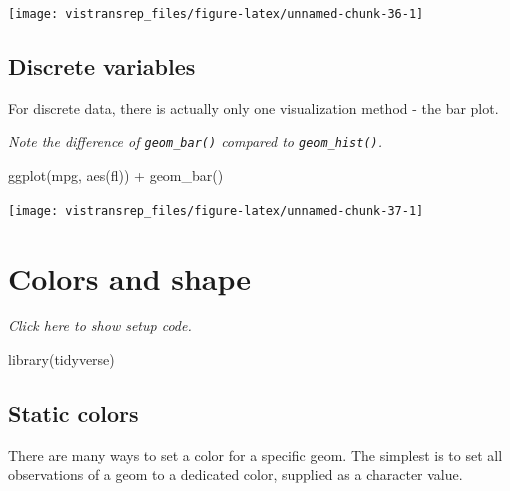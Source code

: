 \documentclass[]{book}
\newenvironment{Shaded}{}{}
\newcommand{\KeywordTok}[1]{\textcolor[rgb]{0.00,0.00,1.00}{#1}}
\newcommand{\NormalTok}[1]{#1}
\newcommand{\OperatorTok}[1]{#1}
\newcommand{\StringTok}[1]{\textcolor[rgb]{0.00,0.50,0.50}{#1}}
\begin{document}
\begin{flushright}\texttt{[image: vistransrep\_files/figure-latex/unnamed-chunk-36-1]} \end{flushright}

\hypertarget{discrete-variables}{%
\subsection{Discrete variables}\label{discrete-variables}}

For discrete data, there is actually only one visualization method - the bar plot.

\smallskip

\emph{Note the difference of \texttt{geom\_bar()} compared to \texttt{geom\_hist()}.}

\begin{Shaded}
\begin{Highlighting}[]
\KeywordTok{ggplot}\NormalTok{(mpg, }\KeywordTok{aes}\NormalTok{(fl)) }\OperatorTok{+}
\StringTok{  }\KeywordTok{geom_bar}\NormalTok{()}
\end{Highlighting}
\end{Shaded}

\begin{flushright}\texttt{[image: vistransrep\_files/figure-latex/unnamed-chunk-37-1]} \end{flushright}

\hypertarget{colors-and-shape}{%
\section{Colors and shape}\label{colors-and-shape}}

\emph{Click here to show setup code.}

\begin{Shaded}
\begin{Highlighting}[]
\KeywordTok{library}\NormalTok{(tidyverse)}
\end{Highlighting}
\end{Shaded}

\hypertarget{static-colors}{%
\subsection{Static colors}\label{static-colors}}

There are many ways to set a color for a specific geom.
The simplest is to set all observations of a geom to a dedicated color, supplied as a character value.
\end{document}
